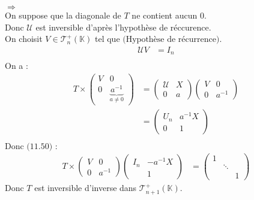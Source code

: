 \documentclass[../main.tex]{subfiles}
\begin{document}
$\boxed{\Rightarrow}$ \\
On suppose que la diagonale de $T$ ne contient aucun $0$. \\
Donc $\mathcal{U}$ est inversible d'après l'hypothèse de réccurence. \\
On choisit $V \in \mathcal{T}_n^+(\mathbb{K})$ tel que $\text{(Hypothèse de récurrence)}$. \\
\begin{align*}
    \mathcal{U}V &= I_n \\
\end{align*}
On a : 
\begin{align*}
    T \times 
    \begin{pmatrix}
        V & 0 \\
        0 & \underbrace{a^{-1}}_{a \neq 0}
    \end{pmatrix}
    &=
    \begin{pmatrix}
        \mathcal{U} & X \\
        0 & a
    \end{pmatrix}
    \begin{pmatrix}
        V & 0 \\
        0 & a^{-1}
    \end{pmatrix} \\
    &= 
    \begin{pmatrix}
        U_n & a^{-1}X \\
        0 & 1
    \end{pmatrix} \\
\end{align*}
Donc $\text{(11.50)}$ : 
\begin{align*}
    T \times 
    \begin{pmatrix}
        V & 0 \\
        0 & a^{-1}
    \end{pmatrix}
    \begin{pmatrix}
        I_n & -a^{-1}X \\
        & 1
    \end{pmatrix}
    &= 
    \begin{pmatrix}
        1 & & \\
        & \ddots & \\
        & & 1
    \end{pmatrix}
\end{align*}
Donc $T$ est inversible d'inverse dans $\mathcal{T}_{n+1}^{+}(\mathbb{K})$. \\ \\
\end{document}
